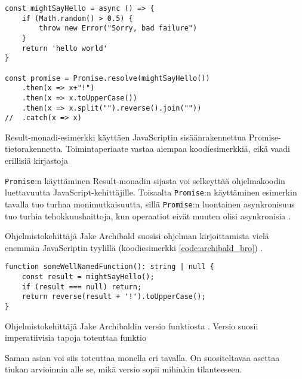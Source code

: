 \begin{code}
    \begin{verbatim}
const mightSayHello = async () => {
    if (Math.random() > 0.5) {
        throw new Error("Sorry, bad failure")
    }
    return 'hello world'
}
    
const promise = Promise.resolve(mightSayHello())
    .then(x => x+"!")
    .then(x => x.toUpperCase())
    .then(x => x.split("").reverse().join(""))
//  .catch(x => x)
\end{verbatim}
    \caption{Result-monadi-esimerkki käyttäen JavaScriptin sisäänrakennettua Promise-tietorakennetta. Toimintaperiaate vastaa aiempaa koodiesimerkkiä, eikä vaadi erillisiä kirjastoja}
    \label{code:result_monad_example_4}
\end{code}

\texttt{Promise}:n käyttäminen Result-monadin sijasta voi selkeyttää ohjelmakoodin luettavuutta JavaScript-kehittäjille. Toisaalta \texttt{Promise}:n käyttäminen esimerkin tavalla tuo turhaa monimutkaisuutta, sillä \texttt{Promise}:n luontainen asynkronisuus tuo turhia tehokkuushaittoja, kun operaatiot eivät muuten olisi asynkronisia \cite{mdn_promise}.

Ohjelmistokehittäjä Jake Archibald suosisi ohjelman kirjoittamista vielä enemmän JavaScriptin tyylillä (koodiesimerkki \ref{code:archibald_bro}) \cite{pennane_fp_gist} .

\begin{code}
    \begin{verbatim}
function someWellNamedFunction(): string | null {
    const result = mightSayHello();
    if (result === null) return;
    return reverse(result + '!').toUpperCase();
}
\end{verbatim}
    \caption{Ohjelmistokehittäjä Jake Archibaldin versio funktiosta \cite{pennane_fp_gist}. Versio suosii imperatiivisia tapoja toteuttaa funktio}
    \label{code:archibald_bro}
\end{code}

Saman asian voi siis toteuttaa monella eri tavalla. On suositeltavaa asettaa tiukan arvioinnin alle se, mikä versio sopii mihinkin tilanteeseen.

